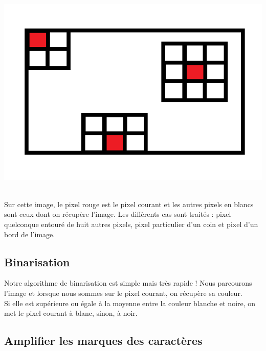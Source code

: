 \documentclass [french,12pt]{article}
\begin{document}
\begin{center} \includegraphics[scale=0.4]{a} \end{center}
\\
Sur cette image, le pixel rouge est le pixel courant  et les autres pixels en blancs sont ceux dont on récupère l'image. Les différents cas sont traités : pixel quelconque entouré de huit autres pixels, pixel particulier d'un coin et pixel d'un bord de l'image.


\subsection{Binarisation}

Notre algorithme de binarisation est simple mais très rapide !  Nous parcourons l'image et lorsque nous sommes sur le pixel courant, on récupère sa couleur. \\
Si elle est supérieure ou égale à la moyenne entre la couleur blanche et noire, on met le pixel courant à blanc, sinon, à noir.\\


\subsection{Amplifier les marques des caractères}
\end{document}
